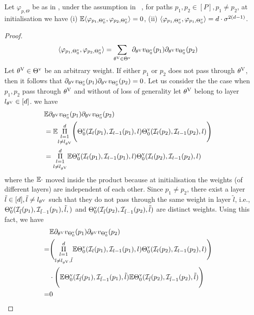 \begin{appendix}
\begin{lemma}\label{lm:dot}
Let $\varphi_{p,\Theta}$ be as in , under the assumption in ~, for paths $p_1,p_2\in [P], p_1\neq p_2$, at initialisation we have (i) $\mathbb{E}{\langle \varphi_{p_1,{\Theta}^{\text{v}}_0}, \varphi_{p_2,{\Theta}^{\text{v}}_0}\rangle}= 0$, (ii) ${\langle \varphi_{p_1,{\Theta}^{\text{v}}_0}, \varphi_{p_1,{\Theta}^{\text{v}}_0}\rangle}= d\cdot \sigma^{2(d-1)}$.
\end{lemma}

\begin{proof}
\begin{align*}
\langle \varphi_{p_1,{\Theta}^{\text{v}}_0}, \varphi_{p_2,{\Theta}^{\text{v}}_0}\rangle= \sum_{{\theta^{\text{V}}}\in {\Theta}^{\text{v}}} \partial_{{\theta^{\text{V}}}}v_{{\Theta}^{\text{v}}_0}(p_1) \partial_{{\theta^{\text{V}}}}v_{{\Theta}^{\text{v}}_0}(p_2)
\end{align*}
Let ${\theta^{\text{V}}}\in{\Theta}^{\text{v}}$ be an arbitrary weight. If either $p_1$ or $p_2$ does not pass through ${\theta^{\text{V}}}$, then it follows that $\partial_{{\theta^{\text{V}}}} v_{{\Theta}^{\text{v}}_0}(p_1) \partial_{{\theta^{\text{V}}}} v_{{\Theta}^{\text{v}}_0}(p_2)=0$. Let us consider the the case when $p_1,p_2$ pass through ${\theta^{\text{V}}}$ and without of loss of generality let ${\theta^{\text{V}}}$ belong to layer $l_{{\theta^{\text{V}}}}\in[d]$. 
  we have
\begin{align*}
&\mathbb{E}{\partial_{{\theta^{\text{V}}}}v_{{\Theta}^{\text{v}}_0}(p_1)\partial_{{\theta^{\text{V}}}}v_{{\Theta}^{\text{v}}_0}(p_2)}\\
&=\mathbb{E}{\underset{l\neq l_{{\theta^{\text{V}}}}}{\underset{l=1}{\overset{d}{\Pi}}} \Bigg({\Theta}^{\text{v}}_0(\mathcal{I}_{l} (p_1),  \mathcal{I}_{l-1}(p_1),l) {\Theta}^{\text{v}}_0(\mathcal{I}_{l}(p_2),\mathcal{I}_{l-1} (p_2),l) \Bigg)}\\
&=\underset{l\neq l_{{\theta^{\text{V}}}}}{\underset{l=1}{\overset{d}{\Pi}}}\mathbb{E}{{\Theta}^{\text{v}}_0(\mathcal{I}_{l}(p_1),\mathcal{I}_{l-1}(p_1),l){\Theta}^{\text{v}}_0(\mathcal{I}_{l}(p_2),\mathcal{I}_{l-1}(p_2),l)}
\end{align*}
where the $\mathbb{E}{\cdot}$ moved inside the product because at initialisation the weights (of different layers) are independent of each other.
Since $p_1\neq p_2$, there exist a layer $\tilde{l}\in[d],\tilde{l}\neq l_{{\theta^{\text{V}}}}$ such that they do not pass through the same weight in layer $\tilde{l}$, i.e., ${\Theta}^{\text{v}}_0(\mathcal{I}_{\tilde{l}}(p_1),\mathcal{I}_{\tilde{l}-1}(p_1),\tilde{l},)$ and ${\Theta}^{\text{v}}_0(\mathcal{I}_{\tilde{l}}(p_2),\mathcal{I}_{\tilde{l}-1}(p_2),\tilde{l})$ are distinct weights. Using this fact,  we have 
\begin{align*}
&\mathbb{E}{\partial_{{\theta^{\text{V}}}}v_{{\Theta}^{\text{v}}_0}(p_1)\partial_{{\theta^{\text{V}}}}v_{{\Theta}^{\text{v}}_0}(p_2)}\\
=&\Bigg(\underset{l\neq l_{{\theta^{\text{V}}}},\tilde{l}}{\underset{l=1}{\overset{d}{\Pi}}}\mathbb{E}{{\Theta}^{\text{v}}_0(\mathcal{I}_l(p_1), \mathcal{I}_{l-1}(p_1),l){\Theta}^{\text{v}}_0(\mathcal{I}_{l}(p_2),\mathcal{I}_{l-1}(p_2),l)}\Bigg)\\
&\cdot\Bigg(\mathbb{E}{{\Theta}^{\text{v}}_0(\mathcal{I}_{\tilde{l}}(p_1),\mathcal{I}_{\tilde{l}-1} (p_1),\tilde{l})}\mathbb{E}{{\Theta}^{\text{v}}_0(\mathcal{I}_{\tilde{l}}(p_2), \mathcal{I}_{\tilde{l}-1 }(p_2),\tilde{l})}\Bigg)\\
=&0
\end{align*}


\end{proof}
\end{appendix}
